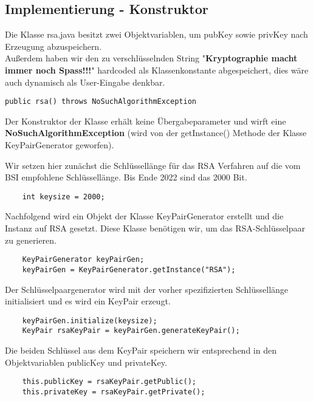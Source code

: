 \documentclass[12pt]{article}
\begin{document}
\subsection{Implementierung - Konstruktor}

Die Klasse rsa.java besitzt zwei Objektvariablen, um pubKey sowie privKey nach Erzeugung abzuspeichern. \\ Außerdem haben wir den zu verschlüsselnden String "\textbf{Kryptographie macht immer noch Spass!!!}" hardcoded als Klassenkonstante abgespeichert, dies wäre auch dynamisch als User-Eingabe denkbar. \\ 

\begin{lstlisting}
public rsa() throws NoSuchAlgorithmException
\end{lstlisting}

Der Konstruktor der Klasse erhält keine Übergabeparameter und wirft eine \textbf{NoSuchAlgorithmException} (wird von der getInstance() Methode der Klasse KeyPairGenerator geworfen).

Wir setzen hier zunächst die Schlüssellänge für das RSA Verfahren auf die vom BSI empfohlene Schlüssellänge. Bis Ende 2022 sind das 2000 Bit.

\begin{lstlisting}
    int keysize = 2000;
\end{lstlisting}

Nachfolgend wird ein Objekt der Klasse KeyPairGenerator erstellt und die Instanz auf RSA gesetzt. Diese Klasse benötigen wir, um das RSA-Schlüsselpaar zu generieren.

\begin{lstlisting}
    KeyPairGenerator keyPairGen;
    keyPairGen = KeyPairGenerator.getInstance("RSA");
\end{lstlisting}

Der Schlüsselpaargenerator wird mit der vorher spezifizierten Schlüssellänge initialisiert und es wird ein KeyPair erzeugt.

\begin{lstlisting}
    keyPairGen.initialize(keysize);
    KeyPair rsaKeyPair = keyPairGen.generateKeyPair();
\end{lstlisting}

Die beiden Schlüssel aus dem KeyPair speichern wir entsprechend in den Objektvariablen publicKey und privateKey.

\begin{lstlisting}
    this.publicKey = rsaKeyPair.getPublic();
    this.privateKey = rsaKeyPair.getPrivate();
\end{lstlisting}
\end{document}
